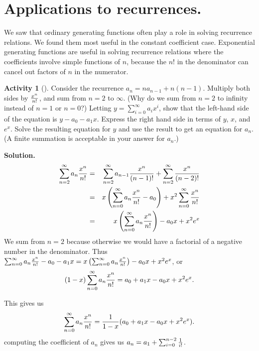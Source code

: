 \documentclass[10pt,]{book}
\theoremstyle{plain}
\theoremstyle{definition}
\newtheorem{activity}[project]{Activity}
\numberwithin{equation}{chapter}
\newcommand{\amp}{&}
\begin{document}
\section[{Applications to recurrences.}]{Applications to recurrences.}\label{section-8}
\typeout{************************************************}
\typeout{************************************************}
We saw that ordinary generating functions often play a role in solving recurrence relations. We found them most useful in the constant coefficient case. Exponential generating functions are useful in solving recurrence relations where the coefficients involve simple functions of \(n\), because the \(n!\) in the denominator can cancel out factors of \(n\) in the numerator.%
\begin{activity}[]\label{activity-88}
Consider the recurrence \(a_n=na_{n-1} +n(n-1)\). Multiply both sides by \(x^n\over n!\), and sum from \(n=2\) to \(\infty\). (Why do we sum from \(n=2\) to infinity instead of \(n=1\) or \(n=0\)?) Letting \(y =
\sum_{i=0}^\infty a_ix^i\), show that the left-hand side of the equation is \(y-a_0 -a_1x\). Express the right hand side in terms of \(y\), \(x\), and \(e^x\). Solve the resulting equation for \(y\) and use the result to get an equation for \(a_n\). (A finite summation is acceptable in your answer for \(a_n\).)%
\par\medskip\noindent%
\textbf{Solution.}\quad %
\begin{align*}
\sum_{n=2}^\infty a_n{x^n\over n!}
\amp =\amp \sum_{n=2}^\infty a_{n-1}{x^n\over (n-1)!} + \sum_{n=2}^\infty
{x^n\over (n-2)!}\\
\amp =\amp  x\left(\sum_{n=0}^\infty a_n{x^n\over n!} - a_0\right) +
x^2\sum_{n=0}^\infty {x^n\over n!}\\
\amp =\amp  x\left(\sum_{n=0}^\infty a_n{x^n\over n!}\right) - a_0x
+x^2e^x
\end{align*}
We sum from \(n=2\) because otherwise we would have a factorial of a negative number in the denominator. Thus \(\sum_{n=0}^\infty a_n{x^n\over
n!} -a_0-a_1x =  x\left(\sum_{n=0}^\infty a_n{x^n\over n!}\right) - a_0x
+x^2e^x\), or%
\begin{equation*}
(1-x)\sum_{n=0}^\infty a_n{x^n\over n!}=a_0+a_1x-a_0x +x^2e^x.
\end{equation*}
%
\par
This gives us%
\begin{equation*}
\sum_{n=0}^\infty a_n{x^n\over n!}={1\over 1-x}(a_0+a_1x-a_0x
+x^2e^x).
\end{equation*}
computing the coefficient of \(a_n\) gives us \(a_n = a_1 +\sum_{i=0}^{n-2}
{1\over i!}\).%
\end{activity}
\end{document}
